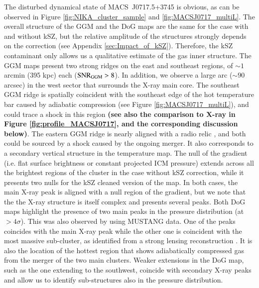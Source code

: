 \documentclass[twocolumn,traditabstract]{aa}
\begin{document}
The disturbed dynamical state of \mbox{MACS~J0717.5+3745} is obvious, as can be observed in Figure \ref{fig:NIKA_cluster_sample} and \ref{fig:MACSJ0717_multiL}. The overall structure of the GGM and the DoG maps are the same for the case with and without kSZ, but the relative amplitude of the structures strongly depends on the correction (see Appendix \ref{sec:Impact_of_kSZ}). Therefore, the kSZ contaminant only allows us a qualitative estimate of the gas inner structure. The GGM maps present two strong ridges on the east and southeast regions, of $\sim 1$ arcmin (395 kpc) each (${\rm SNR}_{\rm GGM} > 8$). In addition, we observe a large arc ($\sim 90$ arcsec) in the west sector that surrounds the X-ray main core. The southeast GGM ridge is spatially coincident with the southeast edge of the hot temperature bar caused by adiabatic compression (see Figure \ref{fig:MACSJ0717_multiL}), and could trace a shock in this region {\bf (see also the comparison to X-ray in Figure \ref{fig:profile_MACSJ0717}, and the corresponding discussion below)}. The eastern GGM ridge is nearly aligned with a radio relic \citep[see, e.g.][]{vanWeeren2017}, and both could be sourced by a shock caused by the ongoing merger. It also corresponds to a secondary vertical structure in the temperature map. The null of the gradient (i.e. flat surface brightness or constant projected ICM pressure) extends across all the brightest regions of the cluster in the case without kSZ correction, while it presents two nulls for the kSZ cleaned version of the map. In both cases, the main X-ray peak is aligned with a null region of the gradient, but we note that the the X-ray structure is itself complex and presents several peaks. Both DoG maps highlight the presence of two main peaks in the pressure distribution (at $> 4 \sigma$). This was also observed by \cite{Mroczkowski2012} using MUSTANG data. One of the peaks coincides with the main X-ray peak while the other one is coincident with the most massive sub-cluster, as identified from a strong lensing reconstruction \citep[e.g.][]{Limousin2015}. It is also the location of the hottest region that shows adiabatically compressed gas from the merger of the two main clusters. Weaker extensions in the DoG map, such as the one extending to the southwest, coincide with secondary X-ray peaks and allow us to identify sub-structures also in the pressure distribution.
\end{document}
